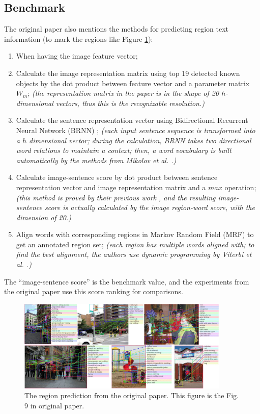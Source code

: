 \documentclass[10pt,twocolumn,letterpaper]{article}
\begin{document}
\subsection{Benchmark}
The original paper also mentions the methods for predicting region text information (to mark the regions like Figure \ref{fig:region}):
\begin{enumerate}
    \item When having the image feature vector;
    \item Calculate the image representation matrix using top 19 detected known objects by the dot product between feature vector and a parameter matrix $W_{m}$;
          \textit{(the representation matrix in the paper is in the shape of 20 $h$-dimensional vectors, thus this is the recognizable resolution.)}
    \item Calculate the sentence representation vector using Bidirectional Recurrent Neural Network (BRNN) \cite{brnn};
          \textit{(each input sentence sequence is transformed into a $h$ dimensional vector;
          during the calculation, BRNN takes two directional word relations to maintain a context;
          then, a word vocabulary is built automatically by the methods from Mikolov et al. \cite{mikolov}.)}
    \item Calculate image-sentence score by dot product between sentence representation vector and image representation matrix and a $max$ operation;
          \textit{(this method is proved by their previous work \cite{karpathy},
          and the resulting image-sentence score is actually calculated by the image region-word score,
          with the dimension of 20.)}
    \item Align words with corresponding regions in Markov Random Field (MRF) to get an annotated region set;
          \textit{(each region has multiple words aligned with;
          to find the best alignment, the authors use dynamic programming by Viterbi et al. \cite{viterbi}.)}
\end{enumerate}

The ``image-sentence score'' is the benchmark value, and the experiments from the original paper use this score ranking for comparisons.

\begin{figure}
    \begin{center}
        \includegraphics[width=0.9\textwidth]{region.png}
    \end{center}
    \caption{The region prediction from the original paper. This figure is the Fig. 9 in original paper.}
    \label{fig:region}
\end{figure}
\end{document}
